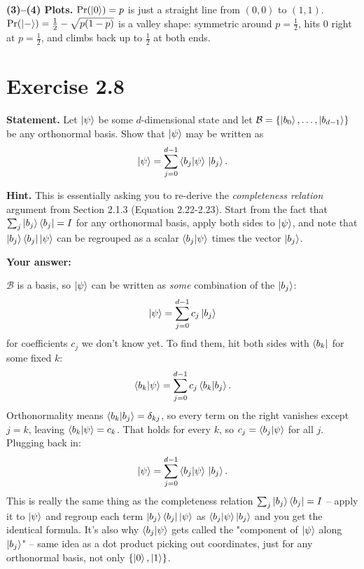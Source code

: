 \documentclass[11pt]{article}
\begin{document}
\textbf{(3)--(4) Plots.} $\Pr(\ket0)=p$ is just a straight line from $(0,0)$ to $(1,1)$. $\Pr(\ket-)=\tfrac12-\sqrt{p(1-p)}$ is a valley shape: symmetric around $p=\tfrac12$, hits $0$ right at $p=\tfrac12$, and climbs back up to $\tfrac12$ at both ends.
\begin{center}
\end{center}

\vspace{1cm}

\section*{Exercise 2.8}
\textbf{Statement.} Let $\ket{\psi}$ be some $d$-dimensional state and let $\mathcal{B} = \{\ket{b_0}, \dots, \ket{b_{d-1}}\}$ be any orthonormal basis. Show that $\ket{\psi}$ may be written as
\[
\ket{\psi} = \sum_{j=0}^{d-1} \braket{b_j|\psi}\,\ket{b_j}.
\]

\textbf{Hint.} This is essentially asking you to re-derive the \emph{completeness relation} argument from Section 2.1.3 (Equation 2.22-2.23). Start from the fact that $\sum_j \ket{b_j}\bra{b_j} = I$ for any orthonormal basis, apply both sides to $\ket{\psi}$, and note that $\ket{b_j}\bra{b_j}\ket{\psi}$ can be regrouped as a scalar $\braket{b_j|\psi}$ times the vector $\ket{b_j}$.

\textbf{Your answer:}

$\mathcal B$ is a basis, so $\ket\psi$ can be written as \emph{some} combination of the $\ket{b_j}$:
\[
\ket\psi = \sum_{j=0}^{d-1} c_j \ket{b_j}
\]
for coefficients $c_j$ we don't know yet. To find them, hit both sides with $\bra{b_k}$ for some fixed $k$:
\[
\braket{b_k|\psi} = \sum_{j=0}^{d-1} c_j \braket{b_k|b_j}.
\]
Orthonormality means $\braket{b_k|b_j} = \delta_{kj}$, so every term on the right vanishes except $j=k$, leaving $\braket{b_k|\psi} = c_k$. That holds for every $k$, so $c_j = \braket{b_j|\psi}$ for all $j$. Plugging back in:
\[
\ket\psi = \sum_{j=0}^{d-1} \braket{b_j|\psi}\,\ket{b_j}.
\]
This is really the same thing as the completeness relation $\sum_j \ket{b_j}\bra{b_j} = I$ -- apply it to $\ket\psi$ and regroup each term $\ket{b_j}\bra{b_j}\ket\psi$ as $\braket{b_j|\psi}\ket{b_j}$ and you get the identical formula. It's also why $\braket{b_j|\psi}$ gets called the "component of $\ket\psi$ along $\ket{b_j}$" -- same idea as a dot product picking out coordinates, just for any orthonormal basis, not only $\{\ket0,\ket1\}$.
\end{document}

